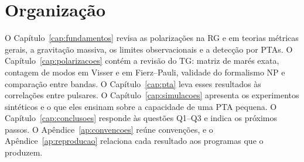 \section{Organização}

O Capítulo~\ref{cap:fundamentos} revisa as polarizações na RG e em
teorias métricas gerais, a gravitação massiva, os limites observacionais
e a detecção por PTAs. O Capítulo~\ref{cap:polarizacoes} contém a revisão
do TG: matriz de marés exata, contagem de modos em Visser e em
Fierz--Pauli, validade do formalismo NP e comparação entre bandas. O
Capítulo~\ref{cap:pta} leva esses resultados às correlações entre
pulsares. O Capítulo~\ref{cap:simulacoes} apresenta os experimentos
sintéticos e o que eles ensinam sobre a capacidade de uma PTA pequena.
O Capítulo~\ref{cap:conclusoes} responde às questões Q1--Q3 e indica os
próximos passos. O Apêndice~\ref{ap:convencoes} reúne convenções, e o
Apêndice~\ref{ap:reproducao} relaciona cada resultado aos programas que o
produzem.
